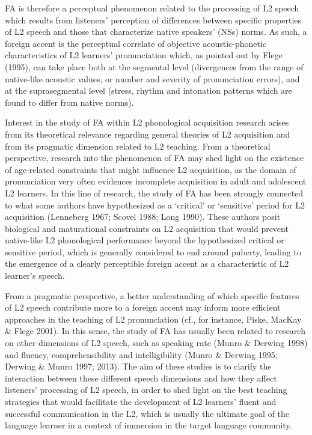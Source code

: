\documentclass[12pt]{article}
\newenvironment{styleStandard}{\setlength\leftskip{0cm}\setlength\rightskip{0cm plus 1fil}\setlength\parindent{0cm}\setlength\parfillskip{0pt plus 1fil}\setlength\parskip{0in plus 1pt}\writerlistparindent\writerlistleftskip\leavevmode\normalfont\normalsize\writerlistlabel\ignorespaces}{\unskip\vspace{0.111in plus 0.0111in}\par}
\newcommand\writerlistleftskip{}
\newcommand\writerlistparindent{}
\newcommand\writerlistlabel{}
\begin{document}
\begin{styleStandard}
FA is therefore a perceptual phenomenon related to the processing of L2 speech which results from listeners’ perception of differences between specific properties of L2 speech and those that characterize native speakers’ (NSs) norms. As such, a foreign accent is the perceptual correlate of objective acoustic-phonetic characteristics of L2 learners’ pronunciation which, as pointed out by Flege (1995), can take place both at the segmental level (divergences from the range of native-like acoustic values, or number and severity of pronunciation errors), and at the suprasegmental level (stress, rhythm and intonation patterns which are found to differ from native norms).
\end{styleStandard}

\begin{styleStandard}
Interest in the study of FA within L2 phonological acquisition research arises from its theoretical relevance regarding general theories of L2 acquisition and from its pragmatic dimension related to L2 teaching. From a theoretical perspective, research into the phenomenon of FA may shed light on the existence of age-related constraints that might influence L2 acquisition, as the domain of pronunciation very often evidences incomplete acquisition in adult and adolescent L2 learners. In this line of research, the study of FA has been strongly connected to what some authors have hypothesized as a ‘critical’ or ‘sensitive’ period for L2 acquisition (Lenneberg 1967; Scovel 1988; Long 1990). These authors posit biological and maturational constraints on L2 acquisition that would prevent native-like L2 phonological performance beyond the hypothesized critical or sensitive period, which is generally considered to end around puberty, leading to the emergence of a clearly perceptible foreign accent as a characteristic of L2 learner’s speech.
\end{styleStandard}

\begin{styleStandard}
From a pragmatic perspective, a better understanding of which specific features of L2 speech contribute more to a foreign accent may inform more efficient approaches in the teaching of L2 pronunciation (cf., for instance, Piske, MacKay \& Flege 2001). In this sense, the study of FA has usually been related to research on other dimensions of L2 speech, such as speaking rate (Munro \& Derwing 1998) and fluency, comprehensibility and intelligibility (Munro \& Derwing 1995; Derwing \& Munro 1997; 2013). The aim of these studies is to clarify the interaction between these different speech dimensions and how they affect listeners’ processing of L2 speech, in order to shed light on the best teaching strategies that would facilitate the development of L2 learners’ fluent and successful communication in the L2, which is usually the ultimate goal of the language learner in a context of immersion in the target language community. 
\end{styleStandard}
\end{document}
